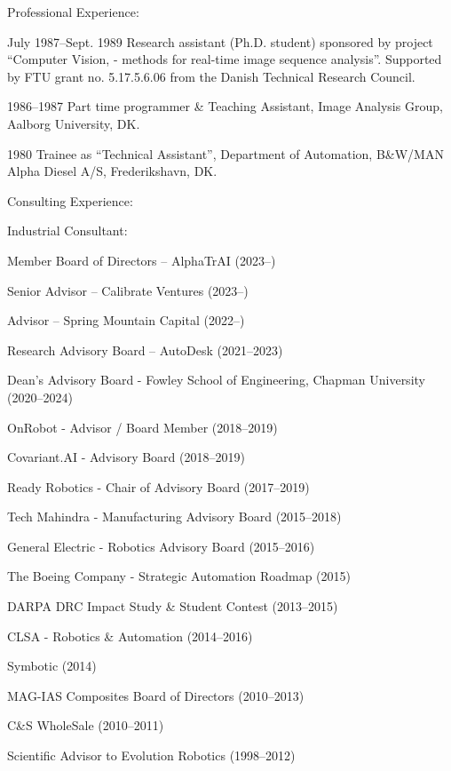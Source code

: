 \documentclass{article}
\newenvironment{sublist}{%
  \begin{list}{}{%
      \setlength{\itemsep}{0em}\setlength{\parsep}{0em}%
      \setlength{\topsep}{0em}\setlength{\parskip}{0em}%
    }%
}%
{ \end{list} }
\begin{document}
\begin{cv}
\begin{cvlist}{Professional Experience:}
\item[July 1987--Sept. 1989] Research assistant (Ph.D. student) sponsored
  by project ``Computer Vision, - methods for real-time image
  sequence analysis''. Supported by FTU grant no. 5.17.5.6.06 from the
  Danish Technical Research Council.

\item[1986--1987] Part time programmer \& Teaching Assistant,
  Image Analysis Group, Aalborg University, DK.

\item[1980] Trainee as ``Technical Assistant'', Department of
  Automation, B\&W/MAN Alpha Diesel A/S, Frederikshavn, DK.\@
\end{cvlist}

\begin{cvlist}{Consulting Experience:}
\item Industrial Consultant:
\begin{sublist}
  \item Member Board of Directors -- AlphaTrAI (2023--)
  \item Senior Advisor -- Calibrate Ventures (2023--)
  \item Advisor -- Spring Mountain Capital (2022--)
  \item Research Advisory Board -- AutoDesk (2021--2023)
  \item Dean's Advisory Board - Fowley School of Engineering, Chapman University
  (2020--2024)
  \item OnRobot - Advisor / Board Member (2018--2019)
  \item Covariant.AI - Advisory Board (2018--2019)
  \item Ready Robotics - Chair of Advisory Board (2017--2019)
  \item Tech Mahindra - Manufacturing Advisory Board (2015--2018)
  \item General Electric - Robotics Advisory Board (2015--2016)
  \item The Boeing Company - Strategic Automation Roadmap (2015)
  \item DARPA DRC Impact Study \& Student Contest (2013--2015)
  \item CLSA - Robotics \& Automation (2014--2016)
  \item Symbotic (2014)
  \item MAG-IAS Composites Board of Directors (2010--2013)
  \item C\&S WholeSale (2010--2011)
  \item Scientific Advisor to Evolution Robotics (1998--2012)

\end{sublist}
\end{cvlist}
\end{cv}
\end{document}
